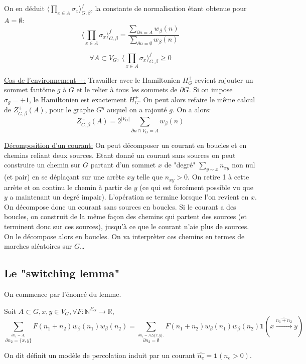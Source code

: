 \documentclass[a4paper,12pt]{report}
\begin{document}
On en déduit $\langle \prod_{x \in A} \sigma_x \rangle_{G,\beta}^f$, la constante de normalisation étant obtenue pour $A = \emptyset$:
$$
\langle \prod_{x \in A} \sigma_x \rangle_{G,\beta}^f = \frac{\sum_{\partial n = A} w_{\beta}(n)}{\sum_{\partial n = \emptyset} w_{\beta}(n)}
$$

\begin{prop}
$$
\forall A \subset V_G, \ \langle \prod_{x \in A} \sigma_x \rangle_{G,\beta}^f \geq 0
$$
\end{prop}

\underline{Cas de l'environnement +:}
Travailler avec le Hamiltonien $H_{G}^+$ revient rajouter un sommet fantôme $g$ à $G$ et le relier à tous les sommets de $\partial G$. Si on impose $\sigma_g = +1$, le Hamiltonien est exactement $H_{G}^+$. On peut alors refaire le même calcul de $Z_{G,\beta}^+(A)$, pour le graphe $G^g$ auquel on a rajouté $g$. On a alors:
$$
Z_{G,\beta}^+(A) = 2^{\vert V_G \vert} \sum_{\partial n \cap V_G  = A} w_{\beta}(n)
$$

\underline{Décomposition d'un courant:} On peut décomposer un courant en boucles et en chemins reliant deux sources. Etant donné un courant sans sources on peut construire un chemin sur $G$ partant d'un sommet $x$ de "degré" $\sum_{y \sim x} n_{xy}$ non nul (et pair) en se déplaçant sur une arrète $xy$ telle que $n_{xy}>0$. On retire 1 à cette arrète et on continu le chemin à partir de $y$ (ce qui est forcément possible vu que $y$ a maintenant un degré impair). L'opération se termine lorsque l'on revient en $x$. On décompose donc un courant sans sources en boucles. Si le courant a des boucles, on construit de la même façon des chemins qui partent des sources (et terminent donc sur ces sources), jusqu'à ce que le courant n'aie plus de sources. On le décompose alors en boucles. On va interprèter ces chemins en termes de marches aléatoires sur $G$\dots

\subsection{Le "switching lemma"}

On commence par l'énoncé du lemme.
\begin{thm}
Soit $A\subset G, x,y \in V_G, \forall F: \mathbb{N}^{E_G} \rightarrow \mathbb{R}$,
$$\sum_{\overset{\partial n_1 = A,}{\partial n_2 = \{x,y\}}} F(n_1+n_2)w_\beta(n_1)w_\beta(n_2) = \sum_{\overset{\partial n_1 = A \Delta\{x,y\},}{\partial n_2 = \emptyset}}F(n_1+n_2)w_\beta(n_1)w_\beta(n_2)\mathbf{1}(x\overset{\widehat{n_1+n_2}}{\longrightarrow}y)
$$
\end{thm}
On dit définit un modèle de percolation induit par un courant $\hat{n_e} = \mathbf{1}(n_e>0)$.
\end{document}
